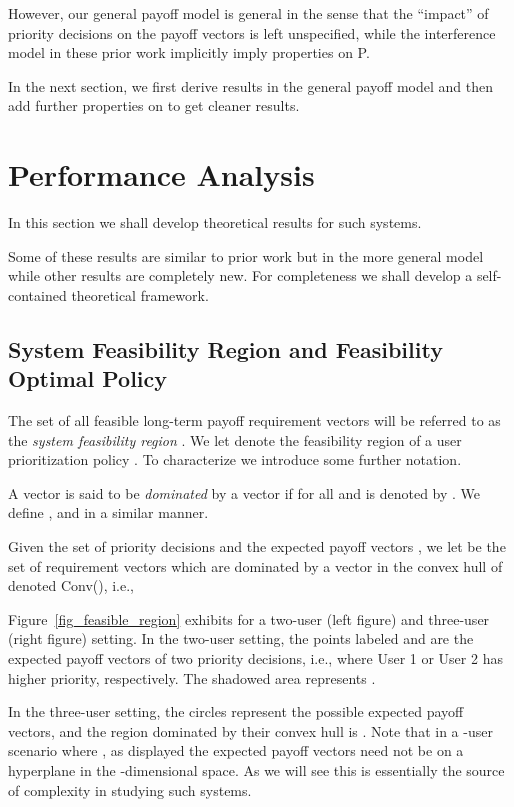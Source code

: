 \documentclass[prodmode,acmtompecs]{acmsmall}
\newcommand{\myComments}[1]{}
\newif\ifinfocom
\newif\ifdissertation
\newcommand{\infocomStart}{\ifinfocom \myComments{Infocom: }}
\newcommand{\dissertationStart}{\ifdissertation  \myComments{Dissertation version: }}
\newcommand{\commentEnd}{\myComments{End}}
\begin{document}
However, our general payoff model is general in the sense that the ``impact'' of priority decisions  on the payoff vectors  is left unspecified, while the interference model in these prior work implicitly imply properties on P. 

In the next section, we first derive results in the general payoff model and then add further properties on  to get cleaner results. 
\commentEnd\fi


\section{Performance Analysis}

In this section we shall develop theoretical results for such systems. 
\infocomStart
To save space we have deferred proofs of these results to the extended version of this paper available at \cite{EXT2}. 
\commentEnd\fi
Some of these results are similar to prior work but in the more general model while other results are completely new. 
For completeness we shall develop a self-contained theoretical framework. 
\dissertationStart
In the sequel we provide examples to help understand these results in the context of SRT applications. 
\commentEnd\fi

\subsection{System Feasibility Region and Feasibility Optimal Policy}
\label{subsection_feasibility_region_and_optimal_scheduling}

The set of all feasible long-term payoff requirement vectors will be referred to as the {\em system feasibility region} . 
We let  denote the feasibility region of a user prioritization policy . 
To characterize  we introduce some further notation. 

A vector  is said to be {\em dominated} by a vector  if  for all  and is denoted by . We define ,  and  in a similar manner. 

Given the set of priority decisions  and the expected payoff vectors , we let  be the set of requirement vectors  which are dominated by a vector in the convex hull of  denoted Conv(), i.e., 


Figure~{\ref{fig_feasible_region}} exhibits  for a two-user (left figure) and three-user (right figure) setting. 
In the two-user setting, the points labeled  and  are the expected payoff vectors of two priority decisions, i.e., where User 1 or User 2 has higher priority, respectively. The shadowed area represents . 
\dissertationStart
Clearly these two expected payoff vectors are always on a line. 
\commentEnd\fi
In the three-user setting, the circles represent the  possible expected payoff vectors, and the region dominated by their convex hull is . 
Note that in a -user scenario where , as displayed the expected payoff vectors need not be on a hyperplane in the -dimensional space. 
As we will see this is essentially the source of complexity in studying such systems. 
\end{document}
